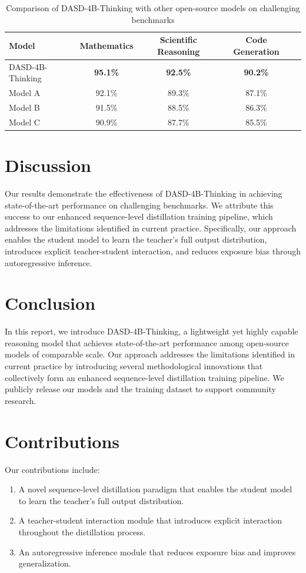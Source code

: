 \documentclass{article}
\begin{document}
\begin{table}[H]
\centering
\caption{Comparison of DASD-4B-Thinking with other open-source models on challenging benchmarks}
\begin{tabular}{lcccc}
\toprule
Model & Mathematics & Scientific Reasoning & Code Generation \\
\midrule
DASD-4B-Thinking & \textbf{95.1\%} & \textbf{92.5\%} & \textbf{90.2\%} \\
\midrule
Model A & 92.1\% & 89.3\% & 87.1\% \\
Model B & 91.5\% & 88.5\% & 86.3\% \\
Model C & 90.9\% & 87.7\% & 85.5\% \\
\bottomrule
\end{tabular}
\label{tab:results}
\end{table}

\section{Discussion}
Our results demonstrate the effectiveness of DASD-4B-Thinking in achieving state-of-the-art performance on challenging benchmarks. We attribute this success to our enhanced sequence-level distillation training pipeline, which addresses the limitations identified in current practice. Specifically, our approach enables the student model to learn the teacher's full output distribution, introduces explicit teacher-student interaction, and reduces exposure bias through autoregressive inference.

\section{Conclusion}
In this report, we introduce DASD-4B-Thinking, a lightweight yet highly capable reasoning model that achieves state-of-the-art performance among open-source models of comparable scale. Our approach addresses the limitations identified in current practice by introducing several methodological innovations that collectively form an enhanced sequence-level distillation training pipeline. We publicly release our models and the training dataset to support community research.

\section{Contributions}
Our contributions include:

\begin{enumerate}
    \item A novel sequence-level distillation paradigm that enables the student model to learn the teacher's full output distribution.
    \item A teacher-student interaction module that introduces explicit interaction throughout the distillation process.
    \item An autoregressive inference module that reduces exposure bias and improves generalization.
\end{enumerate}
\end{document}
